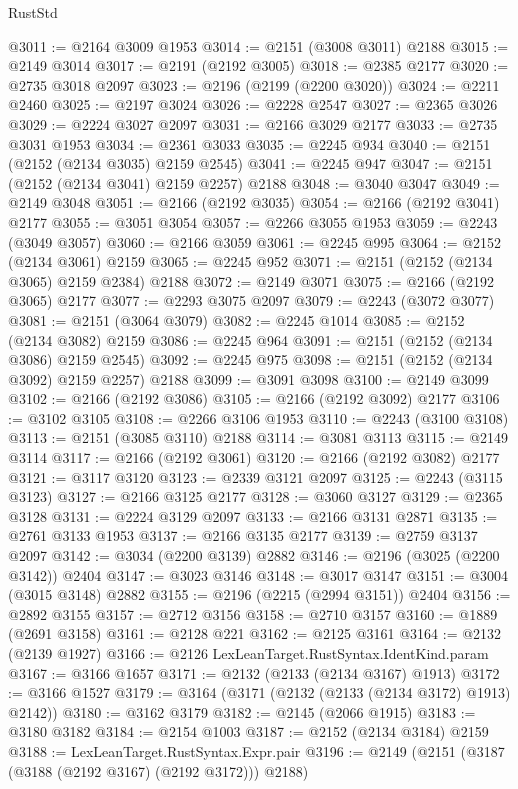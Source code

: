 \begin{lexlean}{RustStd}
\begin{coremodule}
@3011 := @2164 @3009 @1953
@3014 := @2151 (@3008 @3011) @2188
@3015 := @2149 @3014
@3017 := @2191 (@2192 @3005)
@3018 := @2385 @2177
@3020 := @2735 @3018 @2097
@3023 := @2196 (@2199 (@2200 @3020))
@3024 := @2211 @2460
@3025 := @2197 @3024
@3026 := @2228 @2547
@3027 := @2365 @3026
@3029 := @2224 @3027 @2097
@3031 := @2166 @3029 @2177
@3033 := @2735 @3031 @1953
@3034 := @2361 @3033
@3035 := @2245 @934
@3040 := @2151 (@2152 (@2134 @3035) @2159 @2545)
@3041 := @2245 @947
@3047 := @2151 (@2152 (@2134 @3041) @2159 @2257) @2188
@3048 := @3040 @3047
@3049 := @2149 @3048
@3051 := @2166 (@2192 @3035)
@3054 := @2166 (@2192 @3041) @2177
@3055 := @3051 @3054
@3057 := @2266 @3055 @1953
@3059 := @2243 (@3049 @3057)
@3060 := @2166 @3059
@3061 := @2245 @995
@3064 := @2152 (@2134 @3061) @2159
@3065 := @2245 @952
@3071 := @2151 (@2152 (@2134 @3065) @2159 @2384) @2188
@3072 := @2149 @3071
@3075 := @2166 (@2192 @3065) @2177
@3077 := @2293 @3075 @2097
@3079 := @2243 (@3072 @3077)
@3081 := @2151 (@3064 @3079)
@3082 := @2245 @1014
@3085 := @2152 (@2134 @3082) @2159
@3086 := @2245 @964
@3091 := @2151 (@2152 (@2134 @3086) @2159 @2545)
@3092 := @2245 @975
@3098 := @2151 (@2152 (@2134 @3092) @2159 @2257) @2188
@3099 := @3091 @3098
@3100 := @2149 @3099
@3102 := @2166 (@2192 @3086)
@3105 := @2166 (@2192 @3092) @2177
@3106 := @3102 @3105
@3108 := @2266 @3106 @1953
@3110 := @2243 (@3100 @3108)
@3113 := @2151 (@3085 @3110) @2188
@3114 := @3081 @3113
@3115 := @2149 @3114
@3117 := @2166 (@2192 @3061)
@3120 := @2166 (@2192 @3082) @2177
@3121 := @3117 @3120
@3123 := @2339 @3121 @2097
@3125 := @2243 (@3115 @3123)
@3127 := @2166 @3125 @2177
@3128 := @3060 @3127
@3129 := @2365 @3128
@3131 := @2224 @3129 @2097
@3133 := @2166 @3131 @2871
@3135 := @2761 @3133 @1953
@3137 := @2166 @3135 @2177
@3139 := @2759 @3137 @2097
@3142 := @3034 (@2200 @3139) @2882
@3146 := @2196 (@3025 (@2200 @3142)) @2404
@3147 := @3023 @3146
@3148 := @3017 @3147
@3151 := @3004 (@3015 @3148) @2882
@3155 := @2196 (@2215 (@2994 @3151)) @2404
@3156 := @2892 @3155
@3157 := @2712 @3156
@3158 := @2710 @3157
@3160 := @1889 (@2691 @3158)
@3161 := @2128 @221
@3162 := @2125 @3161
@3164 := @2132 (@2139 @1927)
@3166 := @2126 LexLeanTarget.RustSyntax.IdentKind.param
@3167 := @3166 @1657
@3171 := @2132 (@2133 (@2134 @3167) @1913)
@3172 := @3166 @1527
@3179 := @3164 (@3171 (@2132 (@2133 (@2134 @3172) @1913) @2142))
@3180 := @3162 @3179
@3182 := @2145 (@2066 @1915)
@3183 := @3180 @3182
@3184 := @2154 @1003
@3187 := @2152 (@2134 @3184) @2159
@3188 := LexLeanTarget.RustSyntax.Expr.pair
@3196 := @2149 (@2151 (@3187 (@3188 (@2192 @3167) (@2192 @3172))) @2188)

\end{coremodule}
\end{lexlean}

